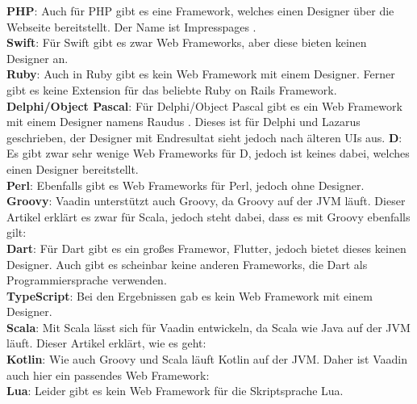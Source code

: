 \documentclass[ngerman]{article}
\begin{document}
    \textbf{PHP}: Auch für PHP gibt es eine Framework, welches einen Designer über die Webseite bereitstellt. Der Name ist Impresspages \cite{impresspages}.\\
    \textbf{Swift}: Für Swift gibt es zwar Web Frameworks, aber diese bieten keinen Designer an.\\
    \textbf{Ruby}: Auch in Ruby gibt es kein Web Framework mit einem Designer. Ferner gibt es keine Extension für das beliebte Ruby on Rails Framework.\\
    \textbf{Delphi/Object Pascal}: Für Delphi/Object Pascal gibt es ein Web Framework mit einem Designer namens Raudus \cite{raudus}. Dieses ist für Delphi und Lazarus geschrieben, der Designer mit Endresultat sieht jedoch nach älteren UIs aus.
    \textbf{D}: Es gibt zwar sehr wenige Web Frameworks für D, jedoch ist keines dabei, welches einen Designer bereitstellt.\\
    \textbf{Perl}: Ebenfalls gibt es Web Frameworks für Perl, jedoch ohne Designer.\\
    \textbf{Groovy}: Vaadin unterstützt auch Groovy, da Groovy auf der JVM läuft. Dieser Artikel erklärt es zwar für Scala, jedoch steht dabei, dass es mit Groovy ebenfalls gilt: \cite{ScalaVaadin}\\
    \textbf{Dart}: Für Dart gibt es ein großes Framewor, Flutter, jedoch bietet dieses keinen Designer. Auch gibt es scheinbar keine anderen Frameworks, die Dart als Programmiersprache verwenden.\\
    \textbf{TypeScript}: Bei den Ergebnissen gab es kein Web Framework mit einem Designer.\\
    \textbf{Scala}: Mit Scala lässt sich für Vaadin entwickeln, da Scala wie Java auf der JVM läuft. Dieser Artikel erklärt, wie es geht: \cite{ScalaVaadin}\\
    \textbf{Kotlin}: Wie auch Groovy und Scala läuft Kotlin auf der JVM. Daher ist Vaadin auch hier ein passendes Web Framework: \cite{KotlinVaadin}\\
    \textbf{Lua}: Leider gibt es kein Web Framework für die Skriptsprache Lua.\\\\
\end{document}
